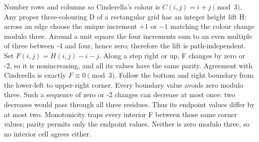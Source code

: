 Number rows and columns so Cinderella's colour is $C(i,j)=i+j\pmod3$. Any proper three-colouring D of a rectangular grid has an integer height lift H: across an edge choose the unique increment $+1$ or $-1$ matching the colour change modulo three. Around a unit square the four increments sum to an even multiple of three between -4 and four, hence zero; therefore the lift is path-independent. Set $F(i,j)=H(i,j)-i-j$. Along a step right or up, F changes by zero or -2, so it is nonincreasing, and all its values have the same parity. Agreement with Cinderella is exactly $F\equiv0\pmod3$. Follow the bottom and right boundary from the lower-left to upper-right corner. Every boundary value avoids zero modulo three. Such a sequence of zero or -2 changes can decrease at most once: two decreases would pass through all three residues. Thus its endpoint values differ by at most two. Monotonicity traps every interior F between those same corner values; parity permits only the endpoint values. Neither is zero modulo three, so no interior cell agrees either.
